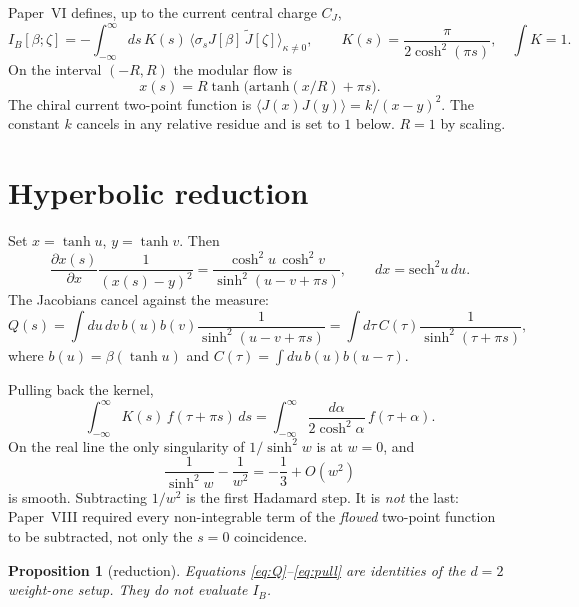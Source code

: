 \documentclass[11pt]{article}
\newtheorem{proposition}{Proposition}[section]
\theoremstyle{definition}
\newcommand{\IB}{I_B}
\begin{document}
Paper~VI defines, up to the current central charge $C_J$,
\begin{equation}
\IB[\beta;\zeta]
=
-\int_{-\infty}^{\infty} ds\,
K(s)\,
\bigl\langle \sigma_s J[\beta]\,\widetilde{J}[\zeta]\bigr\rangle_{\kappa\neq 0},
\qquad
K(s)=\frac{\pi}{2\cosh^{2}(\pi s)},
\quad
\int K=1.
\label{eq:IB}
\end{equation}
On the interval $(-R,R)$ the modular flow is
\begin{equation}
x(s)=R\tanh\bigl(\mathrm{artanh}(x/R)+\pi s\bigr).
\label{eq:flow}
\end{equation}
The chiral current two-point function is
$\langle J(x)J(y)\rangle=k/(x-y)^{2}$. The constant $k$ cancels in
any relative residue and is set to $1$ below. $R=1$ by scaling.

\section{Hyperbolic reduction}
\label{sec:red}

Set $x=\tanh u$, $y=\tanh v$. Then
\begin{equation}
\frac{\partial x(s)}{\partial x}\frac{1}{(x(s)-y)^{2}}
=
\frac{\cosh^{2}u\,\cosh^{2}v}{\sinh^{2}(u-v+\pi s)},
\qquad
dx=\mathrm{sech}^{2}u\,du.
\end{equation}
The Jacobians cancel against the measure:
\begin{equation}
Q(s)
=
\int\!du\,dv\,b(u)b(v)\frac{1}{\sinh^{2}(u-v+\pi s)}
=
\int\!d\tau\,C(\tau)\frac{1}{\sinh^{2}(\tau+\pi s)},
\label{eq:Q}
\end{equation}
where $b(u)=\beta(\tanh u)$ and $C(\tau)=\int du\,b(u)b(u-\tau)$.

Pulling back the kernel,
\begin{equation}
\int_{-\infty}^{\infty}K(s)\,f(\tau+\pi s)\,ds
=
\int_{-\infty}^{\infty}\frac{d\alpha}{2\cosh^{2}\alpha}\,f(\tau+\alpha).
\label{eq:pull}
\end{equation}
On the real line the only singularity of $1/\sinh^{2}w$ is at $w=0$,
and
\begin{equation}
\frac{1}{\sinh^{2}w}-\frac{1}{w^{2}}
=
-\frac13+O(w^{2})
\label{eq:h}
\end{equation}
is smooth. Subtracting $1/w^{2}$ is the first Hadamard step. It is
\emph{not} the last: Paper~VIII required every non-integrable term of
the \emph{flowed} two-point function to be subtracted, not only the
$s=0$ coincidence.

\begin{proposition}[reduction]
\label{prop:red}
Equations \eqref{eq:Q}--\eqref{eq:pull} are identities of the $d=2$
weight-one setup. They do not evaluate $\IB$.
\end{proposition}
\end{document}

